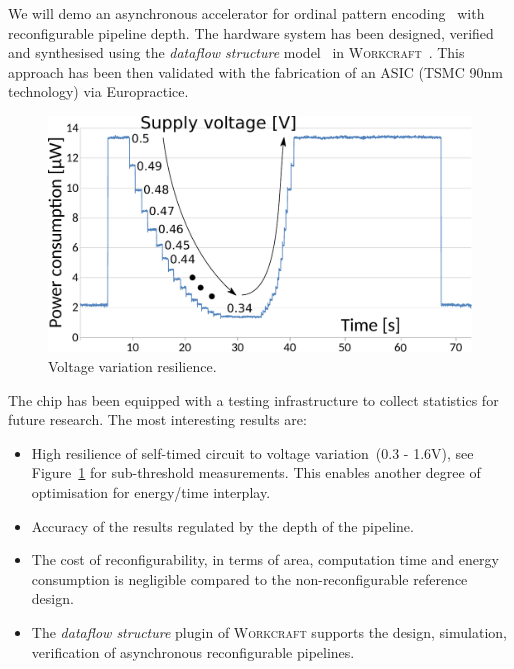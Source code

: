 \documentclass[conference]{IEEEtran}
\begin{document}
We will demo an asynchronous accelerator for ordinal pattern encoding~\cite{OPE} with
reconfigurable pipeline depth. The hardware system has been designed, verified and synthesised
using the \emph{dataflow structure} model~\cite{DFS} in \textsc{Workcraft}~\cite{workcraft_web}. This approach has been
then validated with the fabrication of an ASIC (TSMC 90nm technology) via
Europractice.

\begin{figure}[ht!]
\begin{center}
	\includegraphics[width=\linewidth]{FIG/voltage-var.pdf}
	\caption{Voltage variation resilience.}
	\label{fig:voltage-var}
\end{center}
\end{figure}

\noindent
The chip has been equipped with a testing infrastructure to collect statistics for future research. The most interesting results are: 
\begin{itemize}
\item High resilience of self-timed circuit to voltage variation~(0.3 - 1.6V), see Figure~\ref{fig:voltage-var} for sub-threshold measurements. This enables another degree of optimisation for energy/time interplay.
\item Accuracy of the results regulated by the depth of the pipeline.
\item The cost of reconfigurability, in terms of area, computation time and energy consumption is negligible compared to the non-reconfigurable reference design.
\item The \emph{dataflow structure} plugin of \textsc{Workcraft} supports the design, simulation, verification of asynchronous reconfigurable pipelines.
\end{itemize}
\end{document}
